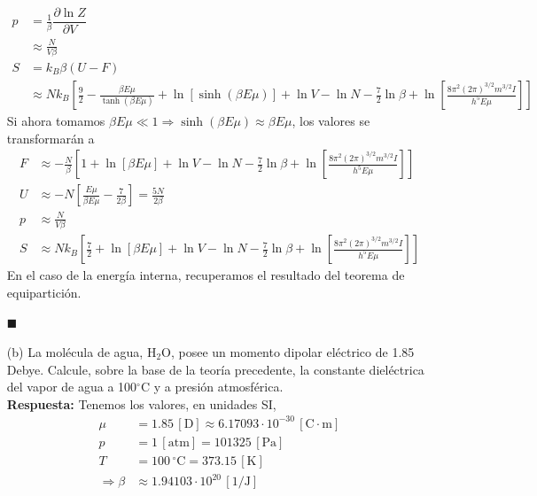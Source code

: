 \documentclass[]{article}
\numberwithin{equation}{section}
\newcommand{\0}{\textcolor{gray}{0}}
\newcommand{\pd}[2]{\dfrac{\partial #1}{\partial #2}}
\newcommand{\qed}{\hfill\(\blacksquare\)}
\begin{document}
\begin{enumerate}
\begin{align}
		p &= \frac{1}{\beta} \pd{\ln Z}{V}\nonumber\\
		&\approx \frac{N}{V \beta}\\
		S &= k_B\beta(U - F)\nonumber\\
		&\approx N k_B \left[\frac{9}{2} - \frac{\beta E \mu}{\tanh\left(\beta E \mu\right)} + \ln\left[\sinh\left(\beta E \mu\right)\right] + \ln V - \ln N - \frac{7}{2} \ln \beta + \ln \left[\frac{8 \pi^2  \left(2\pi \right)^{3/2} m^{3/2} I}{ h^5 E \mu} \right]\right]
	\end{align}
	Si ahora tomamos $\beta E \mu \ll 1 \Rightarrow \sinh\left(\beta E \mu\right) \approx \beta E \mu$, los valores se transformarán a
	\begin{align}
		F &\approx -\frac{N}{\beta} \left[1 + \ln\left[\beta E \mu \right] + \ln V - \ln N - \frac{7}{2} \ln \beta + \ln \left[\frac{8 \pi^2  \left(2\pi \right)^{3/2} m^{3/2} I}{ h^5 E \mu} \right]\right]\\
		U &\approx - N \left[ \frac{E \mu}{\beta E \mu} - \frac{7}{2\beta}\right] =  \frac{5 N}{2\beta} \\
		p &\approx \frac{N}{V \beta}\\
		S &\approx N k_B \left[\frac{7}{2} + \ln\left[\beta E \mu \right] + \ln V - \ln N - \frac{7}{2} \ln \beta + \ln \left[\frac{8 \pi^2  \left(2\pi \right)^{3/2} m^{3/2} I}{ h^5 E \mu} \right]\right]
	\end{align}
	En el caso de la energía interna, recuperamos el resultado del teorema de equipartición.
	
	\qed
	
	\item[(b)] La molécula de agua, $\mathrm{H_2 O}$, posee un momento dipolar eléctrico de 1.85 Debye. Calcule, sobre la base de la teoría precedente, la constante dieléctrica del vapor de agua a 100$^\circ$C y a presión atmosférica.
	\\
	
	\textbf{Respuesta:} Tenemos los valores, en unidades SI,
	\begin{align*}
		\mu &= 1.85 \, \mathrm{[D]} \approx 6.17093\cdot 10^{-30} \, \mathrm{[C\cdot m]} \\
		p &= 1 \, \mathrm{[atm]} = 101325 \, \mathrm{[Pa]} \\
		T &= 100 \, \mathrm{^\circ C} = 373.15 \, \mathrm{[K]} \\
		\Rightarrow \beta &\approx 1.94103\cdot 10^{20} \, \mathrm{[1/J]}
	\end{align*}
	

\end{enumerate}
\end{document}
